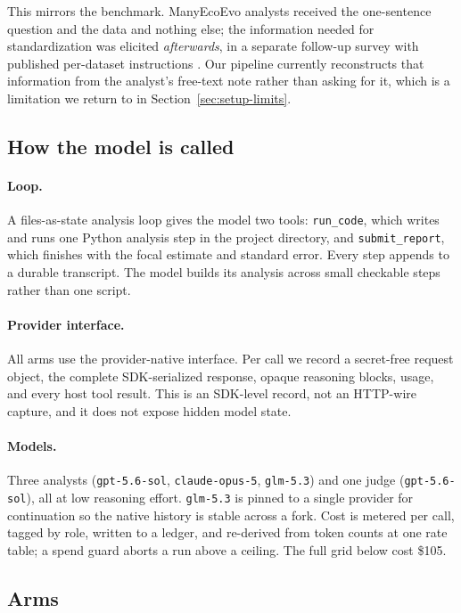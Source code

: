 \documentclass{article}
\begin{document}
This mirrors the benchmark. ManyEcoEvo analysts received the one-sentence
question and the data and nothing else; the information needed for
standardization was elicited \emph{afterwards}, in a separate follow-up survey
with published per-dataset instructions \cite{gould2025same}. Our pipeline
currently reconstructs that information from the analyst's free-text note rather
than asking for it, which is a limitation we return to in
Section~\ref{sec:setup-limits}.

\subsection{How the model is called}
\label{sec:setup-calls}

\paragraph{Loop.}
A files-as-state analysis loop gives the model two tools: \texttt{run\_code},
which writes and runs one Python analysis step in the project directory, and
\texttt{submit\_report}, which finishes with the focal estimate and standard
error. Every step appends to a durable transcript. The model builds its analysis
across small checkable steps rather than one script.

\paragraph{Provider interface.}
All arms use the provider-native interface. Per call we record a secret-free
request object, the complete SDK-serialized response, opaque reasoning blocks,
usage, and every host tool result. This is an SDK-level record, not an
HTTP-wire capture, and it does not expose hidden model state.

\paragraph{Models.}
Three analysts (\texttt{gpt-5.6-sol}, \texttt{claude-opus-5},
\texttt{glm-5.3}) and one judge (\texttt{gpt-5.6-sol}), all at low reasoning
effort. \texttt{glm-5.3} is pinned to a single provider for continuation so the
native history is stable across a fork. Cost is metered per call, tagged by
role, written to a ledger, and re-derived from token counts at one rate table; a
spend guard aborts a run above a ceiling. The full grid below cost \$105.

\subsection{Arms}
\label{sec:setup-arms}
\end{document}
